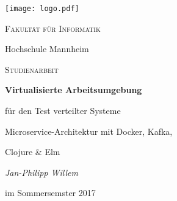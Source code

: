 \begin{titlepage}
{\texttt{[image: logo.pdf]}}\par
\vspace{4cm}
{\scshape\LARGE Fakultät für Informatik \par Hochschule Mannheim\par}
\vspace{0.66cm}
{\scshape\Large Studienarbeit\par}
\vspace{.033cm}
{\huge\bfseries Virtualisierte Arbeitsumgebung\par für den Test verteilter Systeme\par}
{\LARGE Microservice-Architektur mit Docker, Kafka,\par Clojure \& Elm\par}
\vspace{0.66cm}
{\Large\itshape Jan-Philipp Willem\par}
\vspace{.1cm}
{\Large im Sommersemster 2017}
\vfill
\end{titlepage}
